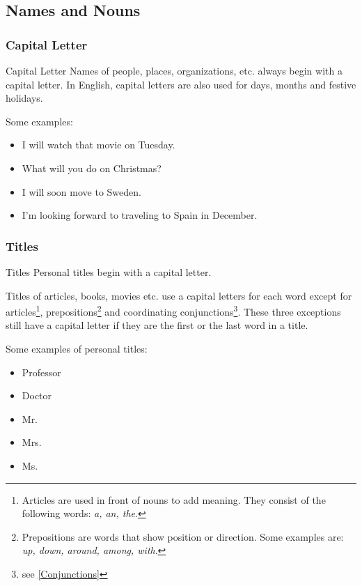 \subsection{Names and Nouns}

\subsubsection{Capital Letter}
\begin{important}{Capital Letter}{}
    Names of people, places, organizations, etc. always begin with a capital letter. In English, capital letters are also used for days, months and festive holidays.
\end{important}

Some examples:
\begin{itemize}
    \item I will watch that movie on Tuesday.
    \item What will you do on Christmas?
    \item I will soon move to Sweden.
    \item I'm looking forward to traveling to Spain in December.
\end{itemize}

\subsubsection{Titles}
\begin{important}{Titles}{}
    Personal titles begin with a capital letter.
    
    Titles of articles, books, movies etc. use a capital letters for each word except for articles\footnote{Articles are used in front of nouns to add meaning. They consist of the following words: \textit{a, an, the}.}, prepositions\footnote{Prepositions are words that show position or direction. Some examples are: \textit{up, down, around, among, with}.} and coordinating conjunctions\footnote{see \ref{Conjunctions}}. These three exceptions still have a capital letter if they are the first or the last word in a title.
\end{important}

Some examples of personal titles:
\begin{itemize}
    \item Professor
    \item Doctor
    \item Mr.
    \item Mrs.
    \item Ms.
\end{itemize}

